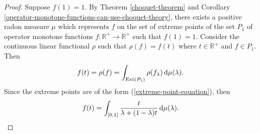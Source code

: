 \documentclass[12pt,a4paper]{amsart}
\theoremstyle{definition}
\begin{document}
	\begin{proof}
		Suppose $f(1) = 1$. By Theorem \ref{choquet-theorem} and Corollary \ref{operator-monotone-functions-can-use-choquet-theory}, there exists a positive radon measure $\mu$ which represents $f$ on the set of extreme points of the set $P_1$ of operator monotone functions $f: \mathbb{R}^{+} \rightarrow \mathbb{R}^{+}$ such that $f(1) = 1$. Consider the continuous linear functional $\rho$ such that $\rho(f) = f(t)$ where $t \in \mathbb{R}^{+}$ and $f \in P_1$. Then 
		\[ f(t) = \rho(f)  = \int_{\text{Ext}(P_1)} \rho(f_{\lambda}) \, {\rm d} \mu(\lambda).  \]
		Since the extreme points are of the form (\ref{extreme-point-equation}), then
		\[  f(t) =  \int_{[0,1]} \frac{t}{\lambda + (1-\lambda)t} \, {\rm d} \mu(\lambda). \]
	\end{proof}
	
	
	
	
	
\end{document}
